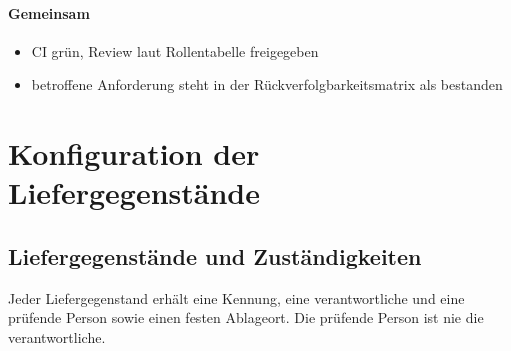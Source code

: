 \documentclass[11pt,a4paper]{article}
\begin{document}
\paragraph{Gemeinsam}

\begin{itemize}
\item[$\square$] CI grün, Review laut Rollentabelle freigegeben
\item[$\square$] betroffene Anforderung steht in der Rückverfolgbarkeitsmatrix als bestanden
\end{itemize}


\section{Konfiguration der Liefergegenstände}

\subsection{Liefergegenstände und Zuständigkeiten}

Jeder Liefergegenstand erhält eine Kennung, eine verantwortliche und eine prüfende Person sowie einen festen Ablageort. Die prüfende Person ist nie die verantwortliche.
\end{document}
